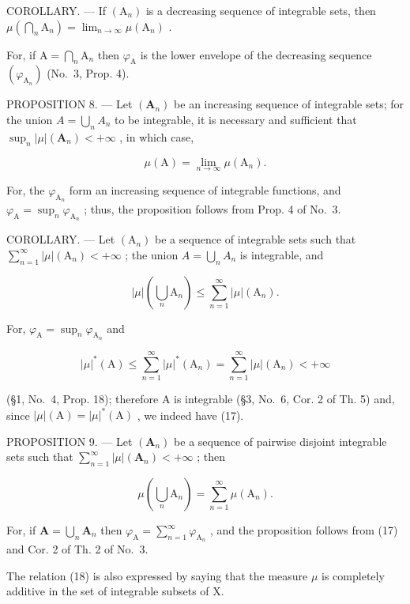 COROLLARY. --- If \((\mathrm{A}_{n})\) is a decreasing sequence of integrable sets, then \(\mu(\bigcap_{n}\mathrm{A}_{n})=\lim_{n\to\infty}\mu(\mathrm{A}_{n})\) .

For, if \(\mathrm{A} = \bigcap_{n}\mathrm{A}_{n}\) then \(\varphi_{\mathrm{A}}\) is the lower envelope of the decreasing sequence \((\varphi_{\mathrm{A}_n})\) (No.~3, Prop. 4).

PROPOSITION 8. --- Let \((\mathbf{A}_{n})\) be an increasing sequence of integrable sets; for the union \(A = \bigcup_{n} A_{n}\) to be integrable, it is necessary and sufficient that \(\sup_{n} |\mu|(\mathbf{A}_{n}) < +\infty\) , in which case,

\[
\mu (\mathrm{A}) = \lim _ {n \rightarrow \infty} \mu (\mathrm{A} _ {n}).\tag{16}
\]

For, the \(\varphi_{\mathrm{A}_n}\) form an increasing sequence of integrable functions, and \(\varphi_{\mathrm{A}} = \sup_n \varphi_{\mathrm{A}_n}\) ; thus, the proposition follows from Prop. 4 of No.~3.

COROLLARY. --- Let \((\mathrm{A}_{n})\) be a sequence of integrable sets such that \(\sum_{n=1}^{\infty} |\mu|(\mathrm{A}_{n}) < +\infty\) ; the union \(A = \bigcup_{n} A_{n}\) is integrable, and

\[
| \mu | \left(\bigcup_ {n} \mathrm{A} _ {n}\right) \leqslant \sum_ {n = 1} ^ {\infty} | \mu | (\mathrm{A} _ {n}).\tag{17}
\]

For, \(\varphi_{\mathrm{A}} = \sup_n\varphi_{\mathrm{A}_n}\) and

\[
| \mu | ^ {*} (\mathrm{A}) \leqslant \sum_ {n = 1} ^ {\infty} | \mu | ^ {*} (\mathrm{A} _ {n}) = \sum_ {n = 1} ^ {\infty} | \mu | (\mathrm{A} _ {n}) <   + \infty
\]

(§1, No.~4, Prop. 18); therefore A is integrable (§3, No.~6, Cor. 2 of Th. 5) and, since \(|\mu|(\mathrm{A}) = |\mu|^*(\mathrm{A})\) , we indeed have (17).

PROPOSITION 9. --- Let \((\mathbf{A}_{n})\) be a sequence of pairwise disjoint integrable sets such that \(\sum_{n=1}^{\infty}|\mu|(\mathbf{A}_{n})<+\infty\) ; then

\[
\mu \left(\bigcup_ {n} \mathrm{A} _ {n}\right) = \sum_ {n = 1} ^ {\infty} \mu (\mathrm{A} _ {n}).\tag{18}
\]

For, if \(\mathbf{A} = \bigcup_{n}\mathbf{A}_{n}\) then \(\varphi_{\mathrm{A}} = \sum_{n = 1}^{\infty}\varphi_{\mathrm{A}_n}\) , and the proposition follows from (17) and Cor. 2 of Th. 2 of No.~3.

The relation (18) is also expressed by saying that the measure \(\mu\) is completely additive in the set of integrable subsets of X.

